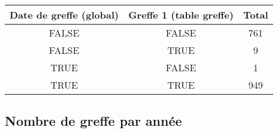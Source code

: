 \documentclass[11pt,a4paper]{article}\usepackage[]{graphicx}\usepackage[]{color}
\begin{document}
\begin{table}[H]
\centering
\begin{tabular}{ccc}
  \hline
Date de greffe (global) & Greffe 1 (table greffe) & Total \\ 
  \hline
FALSE & FALSE & 761 \\ 
  FALSE & TRUE & 9 \\ 
  TRUE & FALSE & 1 \\ 
  TRUE & TRUE & 949 \\ 
   \hline
\end{tabular}
\end{table}


% 
% 
% 
% 
% 
% 
% 
% 
% 

  \subsection{Nombre de greffe par année}
% 
% 
\end{document}
